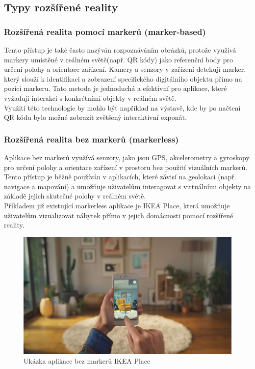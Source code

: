 \subsection{Typy rozšířené reality}
\subsubsection{Rozšířená realita pomocí markerů (marker-based)}
Tento přístup je také často nazýván rozpoznáváním obrázků, protože využívá markery umístěné v reálném světě(např. QR kódy) jako referenční body pro určení polohy a orientace zařízení. Kamery a senzory v zařízení detekují marker, který slouží k identifikaci a zobrazení specifického digitálního objektu přímo na pozici markeru. Tato metoda je jednoduchá a efektivní pro aplikace, které vyžadují interakci s konkrétními objekty v reálném světě. \cite  {AROverview} \\
Využití této technologie by mohlo být například na výstavě, kde by po načtení QR kódu bylo možné zobrazit zvětšený interaktivní exponát.
\subsubsection{Rozšířená realita bez markerů (markerless)}
Aplikace bez markerů využívá senzory, jako jsou GPS, akcelerometry a gyroskopy pro určení polohy a orientace zařízení v prostoru bez použití vizuálních markerů. Tento přístup je běžně používán v aplikacích, které závisí na geolokaci (např. navigace a mapování) a umožňuje uživatelům interagovat s virtuálními objekty na základě jejich skutečné polohy v reálném světě. \cite{AROverview} \\
Příkladem již existující markerless aplikace je IKEA Place, která umožňuje uživatelům vizualizovat nábytek přímo v jejich domácnosti pomocí rozšířené reality. \cite{IkeaPlace} \\
\begin{figure}[h]
    \centering
    \includegraphics[scale=0.2]{images/ikea}
    \caption{Ukázka aplikace bez markerů IKEA Place}
    \label{fig:ikea}
\end{figure}

